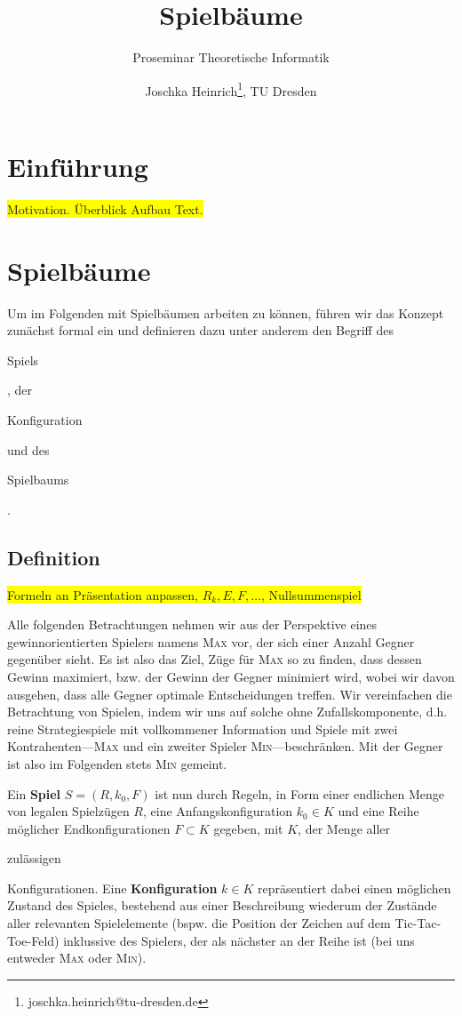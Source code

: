 \documentclass[a4paper,twoside]{scrartcl}
\title{Spielbäume}
\subtitle{Proseminar Theoretische Informatik}
\author{Joschka Heinrich\thanks{joschka.heinrich@tu-dresden.de}, TU Dresden}
\newcommand\e[1]{\begin{em}#1\end{em}}
\newcommand\q[1]{\glqq #1\grqq}
\newcommand\todo[1]{\colorbox{yellow}{#1}}
\begin{document}
\maketitle

\section{Einführung}
\todo{Motivation. Überblick Aufbau Text.}

\section{Spielbäume}
Um im Folgenden mit Spielbäumen arbeiten zu können, führen wir das Konzept zunächst formal ein und definieren dazu unter anderem den Begriff des \e{Spiels}, der \e{Konfiguration} und des \e{Spielbaums}.

\subsection{Definition}

\todo{Formeln an Präsentation anpassen, $R_k, E, F, \dots$, Nullsummenspiel}

Alle folgenden Betrachtungen nehmen wir aus der Perspektive eines gewinnorientierten Spielers namens \textsc{Max} vor, der sich einer Anzahl Gegner gegenüber sieht. Es ist also das Ziel, Züge für \textsc{Max} so zu finden, dass dessen Gewinn maximiert, bzw. der Gewinn der Gegner minimiert wird, wobei wir davon ausgehen, dass alle Gegner optimale Entscheidungen treffen. Wir vereinfachen die Betrachtung von Spielen, indem wir uns auf solche ohne Zufallskomponente, d.h. reine Strategiespiele mit vollkommener Information und Spiele mit zwei Kontrahenten---\textsc{Max} und ein zweiter Spieler \textsc{Min}---beschränken. Mit \q{der Gegner} ist also im Folgenden stets \textsc{Min} gemeint. 

Ein \textbf{Spiel} $S = (R,k_0,F)$ ist nun durch Regeln, in Form einer endlichen Menge von legalen Spielzügen $R$, eine Anfangskonfiguration $k_0 \in K$ und eine Reihe möglicher Endkonfigurationen $F \subset K$ gegeben, mit $K$, der Menge aller \e{zulässigen} Konfigurationen. Eine \textbf{Konfiguration} $k \in K$ repräsentiert dabei einen möglichen Zustand des Spieles, bestehend aus einer Beschreibung wiederum der Zustände aller relevanten Spielelemente (bspw. die Position der Zeichen auf dem Tic-Tac-Toe-Feld) inklussive des Spielers, der als nächster an der Reihe ist (bei uns entweder \textsc{Max} oder \textsc{Min}).
\end{document}
